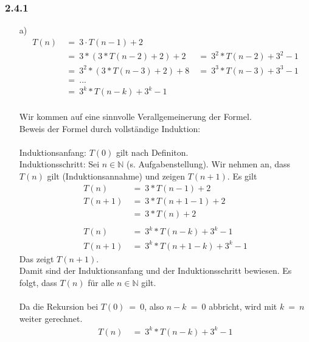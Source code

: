 \documentclass{article}
\begin{document}
\subsubsection{2.4.1}
    \begin{enumerate}
        \item [a)]
        \[
            \begin{array}{lll}
                T(n)~&=~3 \cdot T(n-1)+2 &\\
                &=~3*(3*T(n-2)+2)+2~&=~3^2*T(n-2)+3^2-1\\
                &=~3^2*(3*T(n-3)+2)+8~&=~3^3*T(n-3)+3^3-1\\
                &=~...&\\
                &=~3^k*T(n-k)+3^k-1
            \end{array}
        \]
        \\
        Wir kommen auf eine sinnvolle Verallgemeinerung der Formel.\\
        Beweis der Formel durch vollständige Induktion:\\\\
        Induktionsanfang: $T(0)$ gilt nach Definiton.\\
        Induktionsschritt: Sei $n \in \mathbb{N}$ (s. Aufgabenstellung). Wir nehmen an, dass $T(n)$ gilt (Induktionsannahme) und zeigen $T(n+1)$. Es gilt\\
        \[
            \begin{array}{ll}
                T(n)~&=~3*T(n-1)+2\\
                T(n+1)~&=~3*T(n+1-1)+2\\
                &=~3*T(n)+2
                \\\\
                T(n)~&=~3^k*T(n-k)+3^k-1\\
                T(n+1)~&=~3^k*T(n+1-k)+3^k-1
            \end{array}
        \]
        Das zeigt $T(n+1)$.\\
        Damit sind der Induktionsanfang und der Induktionsschritt bewiesen. Es folgt, dass $T(n)$ für alle $n \in \mathbb{N}$ gilt.\\
        \\
        Da die Rekursion bei $T(0)~=~0$, also $n-k~=~0$ abbricht, wird mit $k~=~n$ weiter gerechnet.\\
        \[
            \begin{array}{ll}
                T(n)~&=~3^k*T(n-k)+3^k-1\\

\end{array}\]
\end{enumerate}
\end{document}
